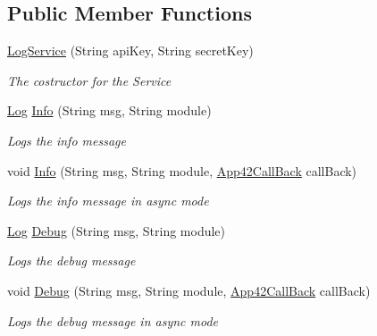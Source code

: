 \subsection*{Public Member Functions}
\begin{DoxyCompactItemize}
\item 
\hyperlink{classcom_1_1shephertz_1_1app42_1_1paas_1_1sdk_1_1csharp_1_1log_1_1_log_service_ac5c24337398ef101c2155ecb6887e142}{Log\+Service} (String api\+Key, String secret\+Key)
\begin{DoxyCompactList}\small\item\em The costructor for the Service \end{DoxyCompactList}\item 
\hyperlink{classcom_1_1shephertz_1_1app42_1_1paas_1_1sdk_1_1csharp_1_1log_1_1_log}{Log} \hyperlink{classcom_1_1shephertz_1_1app42_1_1paas_1_1sdk_1_1csharp_1_1log_1_1_log_service_a38594cb657ec5f762de76051e38dddc4}{Info} (String msg, String module)
\begin{DoxyCompactList}\small\item\em Logs the info message \end{DoxyCompactList}\item 
void \hyperlink{classcom_1_1shephertz_1_1app42_1_1paas_1_1sdk_1_1csharp_1_1log_1_1_log_service_aefbc3ba29b08f6d0eca79d6000cc015b}{Info} (String msg, String module, \hyperlink{interfacecom_1_1shephertz_1_1app42_1_1paas_1_1sdk_1_1csharp_1_1_app42_call_back}{App42\+Call\+Back} call\+Back)
\begin{DoxyCompactList}\small\item\em Logs the info message in async mode \end{DoxyCompactList}\item 
\hyperlink{classcom_1_1shephertz_1_1app42_1_1paas_1_1sdk_1_1csharp_1_1log_1_1_log}{Log} \hyperlink{classcom_1_1shephertz_1_1app42_1_1paas_1_1sdk_1_1csharp_1_1log_1_1_log_service_aa5c6b747b666620e40f323db520a306a}{Debug} (String msg, String module)
\begin{DoxyCompactList}\small\item\em Logs the debug message \end{DoxyCompactList}\item 
void \hyperlink{classcom_1_1shephertz_1_1app42_1_1paas_1_1sdk_1_1csharp_1_1log_1_1_log_service_a36178ce713f2bafd3344c1f718891759}{Debug} (String msg, String module, \hyperlink{interfacecom_1_1shephertz_1_1app42_1_1paas_1_1sdk_1_1csharp_1_1_app42_call_back}{App42\+Call\+Back} call\+Back)
\begin{DoxyCompactList}\small\item\em Logs the debug message in async mode \end{DoxyCompactList}\item 

\end{DoxyCompactItemize}
